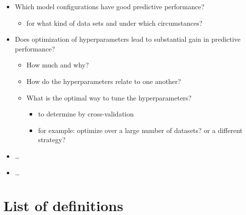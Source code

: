 \documentclass[
]{book}
\providecommand{\tightlist}{%
  \setlength{\itemsep}{0pt}\setlength{\parskip}{0pt}}
\begin{document}
\begin{itemize}
\tightlist
\item
  Which model configurations have good predictive performance?

  \begin{itemize}
  \tightlist
  \item
    for what kind of data sets and under which circumstances?
  \end{itemize}
\item
  Does optimization of hyperparameters lead to substantial gain in predictive performance?

  \begin{itemize}
  \tightlist
  \item
    How much and why?
  \item
    How do the hyperparameters relate to one another?
  \item
    What is the optimal way to tune the hyperparameters?

    \begin{itemize}
    \tightlist
    \item
      to determine by cross-validation
    \item
      for example: optimize over a large number of datasets? or a different strategy?
    \end{itemize}
  \end{itemize}
\item
  \ldots{}
\item
  \ldots{}
\end{itemize}

\hypertarget{appendix-appendix}{%
\appendix}


\hypertarget{list-of-definitions}{%
\chapter{List of definitions}\label{list-of-definitions}}

  
\end{document}
